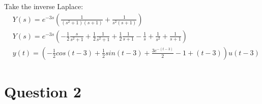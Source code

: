 \documentclass[12pt]{article}
\begin{document}
Take the inverse Laplace:
\begin{align*}
  &Y(s) = e^{-3s}(\frac{1}{(s^2 + 1)(s + 1)} + \frac{1}{s^2(s + 1)})
  \\ &Y(s) = e^{-3s}(-\frac{1}{2}\frac{s}{s^2 + 1} + \frac{1}{2}\frac{1}{s^2 + 1} + \frac{1}{2}\frac{1}{s + 1} -\frac{1}{s} + \frac{1}{s^2} + \frac{1}{s + 1})
  \\ &y(t) = (-\frac{1}{2}cos(t - 3) + \frac{1}{2}sin(t - 3) + \frac{3e^{-(t-3)}}{2} - 1 + (t - 3))u(t - 3)
\end{align*}

\section*{Question 2}
\end{document}
